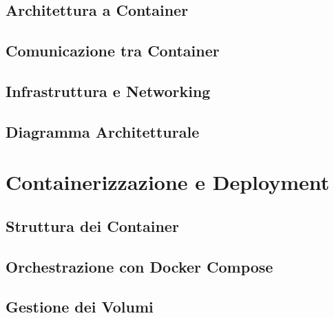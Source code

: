 \documentclass[12pt,a4paper]{report}
\begin{document}
\section{Architettura a Container}

\section{Comunicazione tra Container}

\section{Infrastruttura e Networking}

\section{Diagramma Architetturale}

\chapter{Containerizzazione e Deployment}
\label{cap:docker}

\section{Struttura dei Container}

\section{Orchestrazione con Docker Compose}

\section{Gestione dei Volumi}
\end{document}

